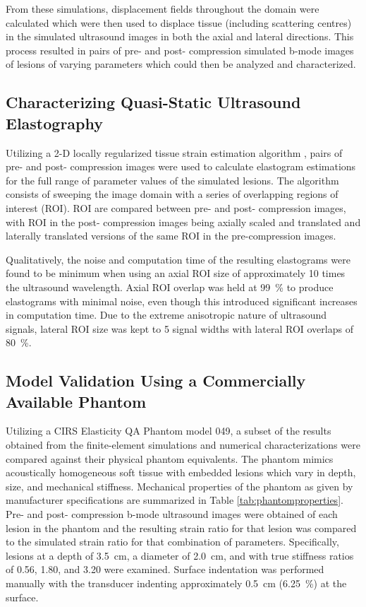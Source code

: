 			From these simulations, displacement fields throughout the domain were calculated which were then used to displace tissue (including scattering centres) in the simulated ultrasound images in both the axial and lateral directions. This process resulted in pairs of pre- and post- compression simulated b-mode images of lesions of varying parameters which could then be analyzed and characterized.

		\subsection{Characterizing Quasi-Static Ultrasound Elastography}
			\label{sec:elastography_algorithm}
			Utilizing a 2-D locally regularized tissue strain estimation algorithm \cite{brusseau08}, pairs of pre- and post- compression images were used to calculate elastogram estimations for the full range of parameter values of the simulated lesions. The algorithm consists of sweeping the image domain with a series of overlapping regions of interest (ROI). ROI are compared between pre- and post- compression images, with ROI in the post- compression images being axially scaled and translated and laterally translated versions of the same ROI in the pre-compression images.

			Qualitatively, the noise and computation time of the resulting elastograms were found to be minimum when using an axial ROI size of approximately 10 times the ultrasound wavelength. Axial ROI overlap was held at \SI{99}{\percent} to produce elastograms with minimal noise, even though this introduced significant increases in computation time. Due to the extreme anisotropic nature of ultrasound signals, lateral ROI size was kept to 5 signal widths with lateral ROI overlaps of \SI{80}{\percent}.

		\subsection{Model Validation Using a Commercially Available Phantom}
			Utilizing a CIRS Elasticity QA Phantom model 049, a subset of the results obtained from the finite-element simulations and numerical characterizations were compared against their physical phantom equivalents. The phantom mimics acoustically homogeneous soft tissue with embedded lesions which vary in depth, size, and mechanical stiffness. Mechanical properties of the phantom as given by manufacturer specifications are summarized in Table \ref{tab:phantomproperties}. Pre- and post- compression b-mode ultrasound images were obtained of each lesion in the phantom and the resulting strain ratio for that lesion was compared to the simulated strain ratio for that combination of parameters. Specifically, lesions at a depth of \SI{3.5}{\cm}, a diameter of \SI{2.0}{\cm}, and with true stiffness ratios of 0.56, 1.80, and 3.20 were examined. Surface indentation was performed manually with the transducer indenting approximately \SI{0.5}{\cm} (\SI{6.25}{\percent}) at the surface.

